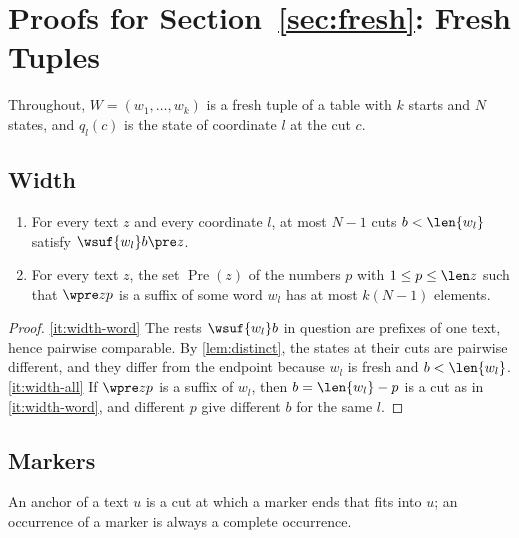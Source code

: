 \section{Proofs for Section~\ref{sec:fresh}: Fresh Tuples}
\label{app:fresh}

Throughout, $W=(w_1,\dots,w_k)$ is a fresh tuple of a table with $k$ starts
and $N$ states, and $q_l(c)$ is the state of coordinate $l$ at the cut $c$.

\subsection{Width}\label{app:fresh-width}

\begin{lemma}[Width]\label{lem:width}
\begin{enumerate}
\item\label{it:width-word} For every text $z$ and every coordinate $l$, at
  most $N-1$ cuts $b<\len{w_l}$ satisfy $\wsuf{w_l}b\pre z$.
\item\label{it:width-all} For every text $z$, the set $\operatorname{Pre}(z)$
  of the numbers $p$ with $1\le p\le\len z$ such that $\wpre zp$ is a suffix
  of some word $w_l$ has at most $k(N-1)$ elements.
\end{enumerate}
\end{lemma}

\begin{proof}
\eqref{it:width-word} The rests $\wsuf{w_l}b$ in question are prefixes of
one text, hence pairwise comparable. By \cref{lem:distinct}, the states at
their cuts are pairwise different, and they differ from the endpoint because
$w_l$ is fresh and $b<\len{w_l}$. \eqref{it:width-all} If $\wpre zp$ is a
suffix of $w_l$, then $b=\len{w_l}-p$ is a cut as in \eqref{it:width-word},
and different $p$ give different $b$ for the same $l$.
\end{proof}

\subsection{Markers}\label{app:fresh-markers}

An anchor of a text $u$ is a cut at which a marker ends that fits into $u$;
an occurrence of a marker is always a complete occurrence.

